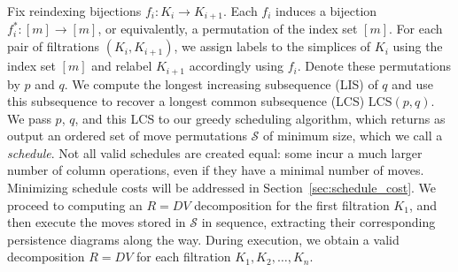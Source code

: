 \documentclass{article} %
\begin{document}
Fix reindexing  bijections $f_i : K_i \to K_{i+1}$. 
Each $f_i$ induces a bijection $f_i^\ast : [m] \to [m]$, or equivalently, a permutation of the index set $[m]$. For each pair of filtrations $(K_i, K_{i+1})$, we assign labels to the simplices of $K_i$ using the index set $[m]$ and relabel $K_{i+1}$ accordingly using $f_i$. Denote these permutations by $p$ and $q$. 
We compute the longest increasing subsequence (LIS) of $q$ and use this subsequence to recover a longest common subsequence (LCS) $\mathrm{LCS}(p,q)$. We pass $p$, $q$, and this LCS to our greedy scheduling algorithm, which returns as output an ordered set of move permutations  $\mathcal{S}$ of minimum size, which we call a \emph{schedule}.
Not all valid schedules are created equal:
some incur a much larger number of column operations,
even if they have a minimal number of moves. 
Minimizing schedule costs will be addressed in 
Section~\ref{sec:schedule_cost}.
We proceed to computing an $R=DV$ decomposition for the first filtration $K_1$, and then execute the moves stored in $\mathcal{S}$ in sequence, extracting their corresponding persistence diagrams along the way. During execution, we obtain a valid decomposition $R = DV$ for each filtration $K_1, K_2, \dots, K_n$. 
\end{document}
